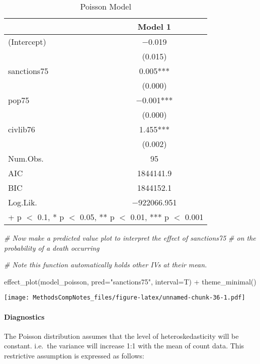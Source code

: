 \documentclass[
]{article}
\newenvironment{Shaded}{\begin{snugshade}}{\end{snugshade}}
\newcommand{\AttributeTok}[1]{\textcolor[rgb]{0.77,0.63,0.00}{#1}}
\newcommand{\CommentTok}[1]{\textcolor[rgb]{0.56,0.35,0.01}{\textit{#1}}}
\newcommand{\FunctionTok}[1]{\textcolor[rgb]{0.00,0.00,0.00}{#1}}
\newcommand{\NormalTok}[1]{#1}
\newcommand{\SpecialCharTok}[1]{\textcolor[rgb]{0.00,0.00,0.00}{#1}}
\newcommand{\StringTok}[1]{\textcolor[rgb]{0.31,0.60,0.02}{#1}}
\begin{document}
\begin{table}

\caption{\label{tab:unnamed-chunk-36}Poisson Model}
\centering
\begin{tabular}[t]{lc}
\toprule
  & Model 1\\
\midrule
(Intercept) & \num{-0.019}\\
 & (\num{0.015})\\
sanctions75 & \num{0.005}***\\
 & \vphantom{1} (\num{0.000})\\
pop75 & \num{-0.001}***\\
 & (\num{0.000})\\
civlib76 & \num{1.455}***\\
 & (\num{0.002})\\
\midrule
Num.Obs. & \num{95}\\
AIC & \num{1844141.9}\\
BIC & \num{1844152.1}\\
Log.Lik. & \num{-922066.951}\\
\bottomrule
\multicolumn{2}{l}{\rule{0pt}{1em}+ p $<$ 0.1, * p $<$ 0.05, ** p $<$ 0.01, *** p $<$ 0.001}\\
\end{tabular}
\end{table}

\begin{Shaded}
\begin{Highlighting}[]
\CommentTok{\# Now make a predicted value plot to interpret the effect of sanctions75}
\CommentTok{\# on the probability of a death occurring}

\CommentTok{\# Note this function automatically holds other IVs at their mean.}

\FunctionTok{effect\_plot}\NormalTok{(model\_poisson, }\AttributeTok{pred=}\StringTok{"sanctions75"}\NormalTok{, }\AttributeTok{interval=}\NormalTok{T) }\SpecialCharTok{+} \FunctionTok{theme\_minimal}\NormalTok{()}
\end{Highlighting}
\end{Shaded}

\texttt{[image: MethodsCompNotes\_files/figure-latex/unnamed-chunk-36-1.pdf]}

\hypertarget{diagnostics}{%
\paragraph{Diagnostics}\label{diagnostics}}

The Poisson distribution assumes that the level of heteroskedasticity
will be constant. i.e.~the variance will increase 1:1 with the mean of
count data. This restrictive assumption is expressed as follows:
\end{document}
